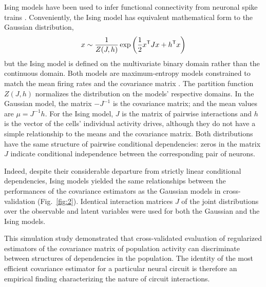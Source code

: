 Ising models have been used to infer functional connectivity from neuronal spike trains \citep{Hertz:2011}. 
Conveniently, the Ising model has equivalent mathematical form to the Gaussian distribution,
\begin{equation}\label{eq:ising}
    x\sim \frac 1 {Z(J,h)} \exp\left(\frac 1 2 x^{\sf T} J x + h^{\sf T} x \right)
\end{equation}
but the Ising model is defined on the multivariate binary domain rather than the continuous domain. 
Both models are maximum-entropy models constrained to match the mean firing rates and the covariance matrix \citep{Jaynes:1957}.
The partition function $Z(J,h)$ normalizes the distribution on the models' respective domains. 
In the Gaussian model, the matrix $-J^{-1}$ is the covariance matrix; and the mean values are $\mu=J^{-1}h$.  
For the Ising model, $J$ is the matrix of pairwise interactions and $h$ is the vector of the cells' individual activity drives, although they do not have a simple relationship to the means and the covariance matrix. 
Both distributions have the same structure of pairwise conditional dependencies: zeros in the matrix $J$ indicate conditional independence between the corresponding pair of neurons. 


Indeed, despite their considerable departure from strictly linear conditional dependencies, Ising models yielded the same relationships between the performances of the covariance estimators as the Gaussian models in cross-validation (Fig.~\ref{fig:2}). Identical interaction matrices $J$  of the joint distributions over the observable and latent variables were used for both the Gaussian and the Ising models.

This simulation study demonstrated that cross-validated evaluation of regularized estimators of the covariance matrix of population activity can discriminate between structures of dependencies in the population. The identity of the most efficient covariance estimator for a particular neural circuit is therefore an empirical finding characterizing the nature of circuit  interactions.
